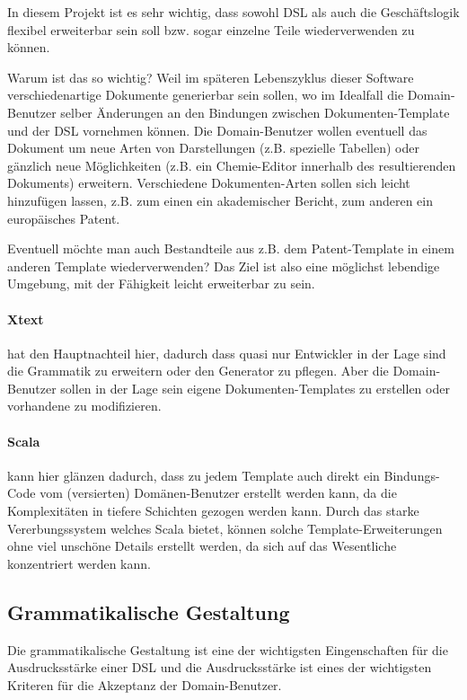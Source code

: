 In diesem Projekt ist es sehr wichtig, dass sowohl DSL als auch
die Geschäftslogik flexibel erweiterbar sein soll bzw. sogar
einzelne Teile wiederverwenden zu können.

Warum ist das so wichtig? Weil im späteren Lebenszyklus dieser Software
verschiedenartige Dokumente generierbar sein sollen, wo im Idealfall
die Domain-Benutzer selber Änderungen an den Bindungen zwischen
Dokumenten-Template und der DSL vornehmen können. Die Domain-Benutzer
wollen eventuell das Dokument um neue Arten von Darstellungen (z.B. spezielle
Tabellen) oder gänzlich neue Möglichkeiten (z.B. ein Chemie-Editor
innerhalb des resultierenden Dokuments) erweitern.
Verschiedene Dokumenten-Arten sollen sich leicht hinzufügen lassen,
z.B. zum einen ein akademischer Bericht, zum anderen ein europäisches Patent.

Eventuell möchte man auch Bestandteile aus z.B. dem Patent-Template in
einem anderen Template wiederverwenden? Das Ziel ist also eine
möglichst lebendige Umgebung, mit der Fähigkeit leicht erweiterbar zu sein.

\paragraph{Xtext} hat den Hauptnachteil hier, dadurch dass quasi nur
Entwickler in der Lage sind die Grammatik zu erweitern oder den
Generator zu pflegen. Aber die Domain-Benutzer sollen in der Lage sein
eigene Dokumenten-Templates zu erstellen oder vorhandene zu modifizieren.

\paragraph{Scala} kann hier glänzen dadurch, dass zu jedem Template auch
direkt ein Bindungs-Code vom (versierten) Domänen-Benutzer erstellt
werden kann, da die Komplexitäten in tiefere Schichten gezogen werden kann.
Durch das starke Vererbungssystem welches Scala bietet, können solche
Template-Erweiterungen ohne viel unschöne Details erstellt werden, da sich
auf das Wesentliche konzentriert werden kann.


\subsection{Grammatikalische Gestaltung}\label{sec-grammatikGestaltung}

Die grammatikalische Gestaltung ist eine der wichtigsten Eingenschaften
für die Ausdrucksstärke einer DSL und die Ausdrucksstärke ist eines
der wichtigsten Kriteren für die Akzeptanz der Domain-Benutzer.


